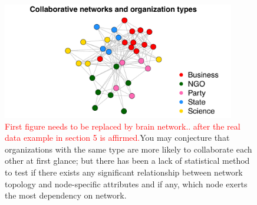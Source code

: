\documentclass[11pt]{article}
\theoremstyle{definition}
\begin{document}
	\begin{figure}[ht]
	 	\centering
	 	\includegraphics[width=4in]{introplot.pdf}	
	 	\caption{\textcolor{red}{First figure needs to be replaced by brain network.. after the real data example in section 5 is affirmed.}You may conjecture that organizations with the same type are more likely to collaborate each other at first glance; but there has been a lack of statistical method to test if there exists any significant relationship between network topology and node-specific attributes and if any, which node exerts the most dependency on network.}
	 	\label{fig:intro}
	\end{figure}
	
\end{document}
